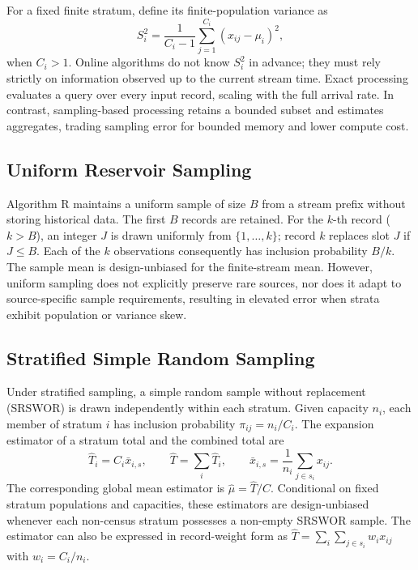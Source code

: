 \documentclass[conference]{IEEEtran}
\begin{document}
For a fixed finite stratum, define its finite-population variance as
\begin{equation}
 S_i^2 = \frac{1}{C_i-1}\sum_{j=1}^{C_i}(x_{ij}-\mu_i)^2,
\end{equation}
when $C_i>1$. Online algorithms do not know $S_i^2$ in advance; they must rely strictly on information observed up to the current stream time. Exact processing evaluates a query over every input record, scaling with the full arrival rate. In contrast, sampling-based processing retains a bounded subset and estimates aggregates, trading sampling error for bounded memory and lower compute cost.

\subsection{Uniform Reservoir Sampling}

Algorithm R maintains a uniform sample of size $B$ from a stream prefix without storing historical data. The first $B$ records are retained. For the $k$-th record ($k>B$), an integer $J$ is drawn uniformly from $\{1,\ldots,k\}$; record $k$ replaces slot $J$ if $J\le B$. Each of the $k$ observations consequently has inclusion probability $B/k$. The sample mean is design-unbiased for the finite-stream mean. However, uniform sampling does not explicitly preserve rare sources, nor does it adapt to source-specific sample requirements, resulting in elevated error when strata exhibit population or variance skew.

\subsection{Stratified Simple Random Sampling}

Under stratified sampling, a simple random sample without replacement (SRSWOR) is drawn independently within each stratum. Given capacity $n_i$, each member of stratum $i$ has inclusion probability $\pi_{ij}=n_i/C_i$. The expansion estimator of a stratum total and the combined total are
\begin{equation}
 \widehat{T}_i=C_i\bar{x}_{i,s},\qquad
 \widehat{T}=\sum_i\widehat{T}_i,
 \qquad
 \bar{x}_{i,s}=\frac{1}{n_i}\sum_{j\in s_i}x_{ij}.
\end{equation}
The corresponding global mean estimator is $\widehat{\mu}=\widehat{T}/C$. Conditional on fixed stratum populations and capacities, these estimators are design-unbiased whenever each non-census stratum possesses a non-empty SRSWOR sample. The estimator can also be expressed in record-weight form as $\widehat{T}=\sum_i\sum_{j\in s_i}w_i x_{ij}$ with $w_i=C_i/n_i$.
\end{document}
